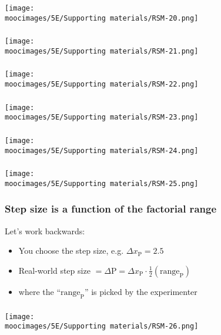 \documentclass[handout,11pt,aspectratio=169,mathserif]{beamer}
\begin{document}
\begin{frame}\frametitle{}
	\centerline{\texttt{[image: \\moocimages/5E/Supporting materials/RSM-20.png]}}
\end{frame}
\begin{frame}\frametitle{}
	\centerline{\texttt{[image: \\moocimages/5E/Supporting materials/RSM-21.png]}}
\end{frame}
\begin{frame}\frametitle{}
	\centerline{\texttt{[image: \\moocimages/5E/Supporting materials/RSM-22.png]}}
\end{frame}
\begin{frame}\frametitle{}
	\centerline{\texttt{[image: \\moocimages/5E/Supporting materials/RSM-23.png]}}
\end{frame}
\begin{frame}\frametitle{}
	\centerline{\texttt{[image: \\moocimages/5E/Supporting materials/RSM-24.png]}}
\end{frame}
\begin{frame}\frametitle{}
	\centerline{\texttt{[image: \\moocimages/5E/Supporting materials/RSM-25.png]}}
\end{frame}

\begin{frame}\frametitle{Step size is a function of the factorial range}
	Let's work backwards:\vspace{1cm}
	\begin{itemize}
		\item	You choose the step size, e.g. $\Delta x_\text{P} = 2.5$
		\vspace{0.5cm}
		\item	Real-world step size $= \Delta \text{P} = \Delta x_\text{P} \cdot \tfrac{1}{2}\left(\text{range}_\text{P} \right) $
		\vspace{0.5cm}
		\item	where the ``$\text{range}_\text{P}$'' is picked by the experimenter 
	\end{itemize}
\end{frame}

\begin{frame}\frametitle{}
	\centerline{\texttt{[image: \\moocimages/5E/Supporting materials/RSM-26.png]}}
\end{frame}
\end{document}
